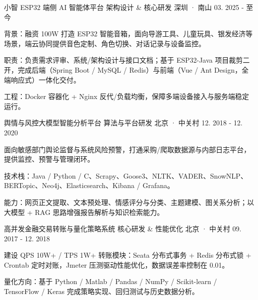 \begin{cventries}
  \vspace{2.5mm}
  \cventry
    {小智 ESP32 端侧 AI 智能体平台}
    {架构设计 \& 核心研发}
    {深圳 · 南山} %
    {03. 2025 - 至今} %
    {
      \begin{cvitems}
        \item {背景：融资 100W 打造 ESP32 智能音箱，面向导游工具、儿童玩具、银发经济等场景，端云协同提供音色定制、角色切换、对话记录与设备监控。}
        \item {职责：负责需求评审、系统/架构设计与接口文档；基于 ESP32-Java 项目裁剪二开，完成后端（Spring Boot / MySQL / Redis）与前端（Vue / Ant Design，全端响应式）一体化交付。}
        \item {工程：Docker 容器化 + Nginx 反代/负载均衡，保障多端设备接入与服务端稳定运行。}
      \end{cvitems}
    }

  \vspace{2.5mm}
  \cventry
    {舆情与风控大模型智能分析平台}
    {算法与平台研发}
    {北京 · 中关村} %
    {12. 2018 - 12. 2020} %
    {
      \begin{cvitems}
        \item {面向敏感部门舆论监督与系统风险预警，打通采购/爬取数据源与内部日志平台，提供监控、预警与管理闭环。}
        \item {技术栈：Java / Python / C、Scrapy、Goose3、NLTK、VADER、SnowNLP、BERTopic、Neo4j、Elasticsearch、Kibana / Grafana。}
        \item {能力：网页正文提取、文本预处理、情感评分与分类、主题建模、图关系分析；以大模型 + RAG 思路增强报告解析与知识检索能力。}
      \end{cvitems}
    }

  \vspace{2.5mm}
  \cventry
    {高并发金融交易转账与量化策略系统}
    {核心研发 \& 性能优化}
    {北京 · 中关村} %
    {09. 2017 - 12. 2018} %
    {
      \begin{cvitems}
        \item {建设 QPS 10W+ / TPS 1W+ 转账模块：Seata 分布式事务 + Redis 分布式锁 + Crontab 定时对账，Jmeter 压测驱动性能优化，数据误差率控制在 0.01。}
        \item {量化方向：基于 Python / Matlab / Pandas / NumPy / Scikit-learn / TensorFlow / Keras 完成策略实现、回归测试与历史数据分析。}
      \end{cvitems}
    }

\end{cventries}
\vspace{4mm}
